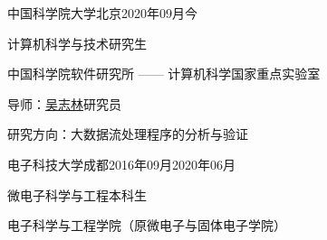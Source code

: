 
\begin{eduitem}{中国科学院大学}{北京}{2020年09月}{今}
    \item 计算机科学与技术研究生
    \item 中国科学院软件研究所 —— 计算机科学国家重点实验室
    \item 导师：\href{http://lcs.ios.ac.cn/~wuzl/}{吴志林}研究员
    \item 研究方向：大数据流处理程序的分析与验证
\end{eduitem}

\begin{eduitem}{电子科技大学}{成都}{2016年09月}{2020年06月}
\item 微电子科学与工程本科生
\item 电子科学与工程学院（原微电子与固体电子学院）
\end{eduitem}



\endinput